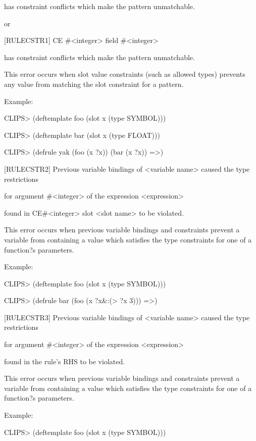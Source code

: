 \documentclass[letterpaper,10pt,english]{sphinxmanual}
\begin{document}
has constraint conflicts which make the pattern unmatchable.

or

{[}RULECSTR1{]} CE \#\textless{}integer\textgreater{} field \#\textless{}integer\textgreater{}

has constraint conflicts which make the pattern unmatchable.

This error occurs when slot value constraints (such as allowed types)
prevents any value from matching the slot constraint for a pattern.

Example:

CLIPS\textgreater{} (deftemplate foo (slot x (type SYMBOL)))

CLIPS\textgreater{} (deftemplate bar (slot x (type FLOAT)))

CLIPS\textgreater{} (defrule yak (foo (x ?x)) (bar (x ?x)) =\textgreater{})

{[}RULECSTR2{]} Previous variable bindings of \textless{}variable name\textgreater{} caused the
type restrictions

for argument \#\textless{}integer\textgreater{} of the expression \textless{}expression\textgreater{}

found in CE\#\textless{}integer\textgreater{} slot \textless{}slot name\textgreater{} to be violated.

This error occurs when previous variable bindings and constraints
prevent a variable from containing a value which satisfies the type
constraints for one of a function?s parameters.

Example:

CLIPS\textgreater{} (deftemplate foo (slot x (type SYMBOL)))

CLIPS\textgreater{} (defrule bar (foo (x ?x\&:(\textgreater{} ?x 3))) =\textgreater{})

{[}RULECSTR3{]} Previous variable bindings of \textless{}variable name\textgreater{} caused the
type restrictions

for argument \#\textless{}integer\textgreater{} of the expression \textless{}expression\textgreater{}

found in the rule’s RHS to be violated.

This error occurs when previous variable bindings and constraints
prevent a variable from containing a value which satisfies the type
constraints for one of a function?s parameters.

Example:

CLIPS\textgreater{} (deftemplate foo (slot x (type SYMBOL)))
\end{document}
